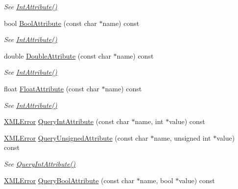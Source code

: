 \begin{DoxyCompactItemize}
\begin{DoxyCompactList}\small\item\em See \hyperlink{classtinyxml2_1_1_x_m_l_element_af86f05771c11a73a2896b662bb589ef5}{Int\-Attribute()} \end{DoxyCompactList}\item 
bool \hyperlink{classtinyxml2_1_1_x_m_l_element_a34811e4d1881e4ecc95c49f0f3799115}{Bool\-Attribute} (const char $\ast$name) const 
\begin{DoxyCompactList}\small\item\em See \hyperlink{classtinyxml2_1_1_x_m_l_element_af86f05771c11a73a2896b662bb589ef5}{Int\-Attribute()} \end{DoxyCompactList}\item 
double \hyperlink{classtinyxml2_1_1_x_m_l_element_a536922a5cae9c9769a3dc1b7a8ff0d44}{Double\-Attribute} (const char $\ast$name) const 
\begin{DoxyCompactList}\small\item\em See \hyperlink{classtinyxml2_1_1_x_m_l_element_af86f05771c11a73a2896b662bb589ef5}{Int\-Attribute()} \end{DoxyCompactList}\item 
float \hyperlink{classtinyxml2_1_1_x_m_l_element_a33b69f123f995aff966d2e351bc51b1f}{Float\-Attribute} (const char $\ast$name) const 
\begin{DoxyCompactList}\small\item\em See \hyperlink{classtinyxml2_1_1_x_m_l_element_af86f05771c11a73a2896b662bb589ef5}{Int\-Attribute()} \end{DoxyCompactList}\item 
\hyperlink{namespacetinyxml2_a1fbf88509c3ac88c09117b1947414e08}{X\-M\-L\-Error} \hyperlink{classtinyxml2_1_1_x_m_l_element_a8b92c729346aa8ea9acd59ed3e9f2378}{Query\-Int\-Attribute} (const char $\ast$name, int $\ast$value) const 
\item 
\hyperlink{namespacetinyxml2_a1fbf88509c3ac88c09117b1947414e08}{X\-M\-L\-Error} \hyperlink{classtinyxml2_1_1_x_m_l_element_aa3d8d1b9311da8fc249b4352749aaa84}{Query\-Unsigned\-Attribute} (const char $\ast$name, unsigned int $\ast$value) const 
\begin{DoxyCompactList}\small\item\em See \hyperlink{classtinyxml2_1_1_x_m_l_element_a8b92c729346aa8ea9acd59ed3e9f2378}{Query\-Int\-Attribute()} \end{DoxyCompactList}\item 
\hyperlink{namespacetinyxml2_a1fbf88509c3ac88c09117b1947414e08}{X\-M\-L\-Error} \hyperlink{classtinyxml2_1_1_x_m_l_element_a2a58ee941c3cda23772c887a8f8b534e}{Query\-Bool\-Attribute} (const char $\ast$name, bool $\ast$value) const 

\end{DoxyCompactItemize}
